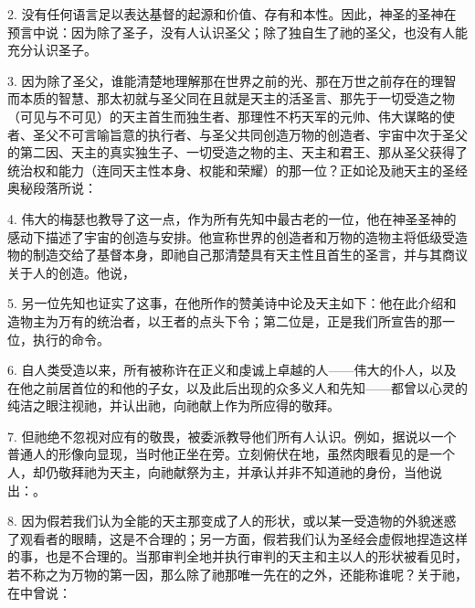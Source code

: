 2. 没有任何语言足以表达基督的起源和价值、存有和本性。因此，神圣的圣神在预言中说：因为除了圣子，没有人认识圣父；除了独自生了祂的圣父，也没有人能充分认识圣子。\par

3. 因为除了圣父，谁能清楚地理解那在世界之前的光、那在万世之前存在的理智而本质的智慧、那太初就与圣父同在且就是天主的活圣言、那先于一切受造之物（可见与不可见）的天主首生而独生者、那理性不朽天军的元帅、伟大谋略的使者、圣父不可言喻旨意的执行者、与圣父共同创造万物的创造者、宇宙中次于圣父的第二因、天主的真实独生子、一切受造之物的主、天主和君王、那从圣父获得了统治权和能力（连同天主性本身、权能和荣耀）的那一位？正如论及祂天主的圣经奥秘段落所说：\par

4. 伟大的梅瑟也教导了这一点，作为所有先知中最古老的一位，他在神圣圣神的感动下描述了宇宙的创造与安排。他宣称世界的创造者和万物的造物主将低级受造物的制造交给了基督本身，即祂自己那清楚具有天主性且首生的圣言，并与其商议关于人的创造。他说，\par

5. 另一位先知也证实了这事，在他所作的赞美诗中论及天主如下：他在此介绍和造物主为万有的统治者，以王者的点头下令；第二位是，正是我们所宣告的那一位，执行的命令。\par

6. 自人类受造以来，所有被称许在正义和虔诚上卓越的人——伟大的仆人，以及在他之前居首位的和他的子女，以及此后出现的众多义人和先知——都曾以心灵的纯洁之眼注视祂，并认出祂，向祂献上作为所应得的敬拜。\par

7. 但祂绝不忽视对应有的敬畏，被委派教导他们所有人认识。例如，据说以一个普通人的形像向显现，当时他正坐在旁。立刻俯伏在地，虽然肉眼看见的是一个人，却仍敬拜祂为天主，向祂献祭为主，并承认并非不知道祂的身份，当他说出：。\par

8. 因为假若我们认为全能的天主那变成了人的形状，或以某一受造物的外貌迷惑了观看者的眼睛，这是不合理的；另一方面，假若我们认为圣经会虚假地捏造这样的事，也是不合理的。当那审判全地并执行审判的天主和主以人的形状被看见时，若不称之为万物的第一因，那么除了祂那唯一先在的之外，还能称谁呢？关于祂，在中曾说：\par

